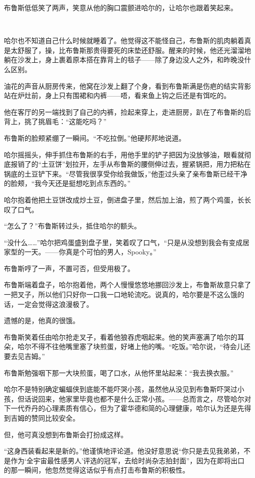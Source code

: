 \documentclass[../main]{subfiles}
\begin{document}
布鲁斯低低笑了两声，笑意从他的胸口震颤进哈尔的，让哈尔也跟着笑起来。

~\

哈尔也不知道自己什么时候就睡着了。他觉得这不能怪自己，布鲁斯的肌肉躺着真是太舒服了，操，比布鲁斯那贵得要死的床垫还舒服。醒来的时候，他还光溜溜地躺在沙发上，身上裹着原本搭在靠背上的毯子——除了身边没人之外，和昨晚没什么区别。

油花的声音从厨房传来，他窝在沙发上翻了个身，看到布鲁斯满是伤疤的结实背影站在炉灶前，身上只有围裙和内裤——唔，看来鱼上钩之后还是有饵吃的。

他在客厅的另一端找到了自己的内裤，捡起来穿上，走进厨房，趴在了布鲁斯的后背上，挑了挑眉毛：“这能吃吗？”

布鲁斯的脸颊紧绷了一瞬间。“不吃拉倒。”他硬邦邦地说道。

哈尔摇摇头，伸手抓住布鲁斯的右手，用他手里的铲子把因为没放够油，眼看就彻底报销了的“土豆饼”划拉开，左手从布鲁斯的腰侧伸过去，握紧锅把，用力把粘在锅底的土豆铲下来。“尽管我很享受你给我做饭，”他歪过头亲了亲布鲁斯已经干净的脸颊，“我今天还是挺想吃到点东西的。”

哈尔抱着他把土豆饼改成炒土豆，倒进盘子里，然后加上油，煎了两个鸡蛋，长长叹了口气。

“怎么了？”布鲁斯转过头，抵住哈尔的额头。

“没什么……”哈尔把鸡蛋盛到盘子里，笑着叹了口气，“只是从没想到我会有变成居家型的一天。——你真是个可怕的男人，Spooky。”

布鲁斯哼了一声，不置可否，但受用极了。

布鲁斯端着盘子，哈尔抱着他，两个人慢慢悠悠地挪回沙发上，布鲁斯故意只拿了一把叉子，所以他们只好你一口我一口地轮流吃。说真的，哈尔要是不这么饿的话，一定会觉得这浪漫极了。

遗憾的是，他真的很饿。

布鲁斯笑着任由哈尔抢走叉子，看着他狼吞虎咽起来。他的笑声塞满了哈尔的耳朵，哈尔不得不往他嘴里塞了块煎蛋，好堵上他的嘴。“吃饭。”哈尔说，“待会儿还要去见吉姆。”

布鲁斯勉强咽下那一大块煎蛋，喝了口水，从他怀里站起来：“我去换衣服。”

哈尔不是特别确定蝙蝠侠到底能不能吓哭小孩，虽然他从没见到布鲁斯吓哭过小孩，但话说回来，他家里毕竟也都不是什么正常小孩。——总而言之，尽管哈尔对下一代乔丹的心理素质有信心，但为了霍华德和简的心理健康，哈尔认为还是先得到吉姆的赞同比较安全。

但，他可真没想到布鲁斯会打扮成这样。

“这身西装看起来是新的。”他谨慎地评论道。他没好意思说“你只是去见我弟弟，不是作为‘全宇宙最性感男人’评选的冠军，去给时尚杂志拍封面”，因为在即将出口的那一瞬间，他忽然觉得这话似乎有点打击布鲁斯的积极性。
\end{document}
